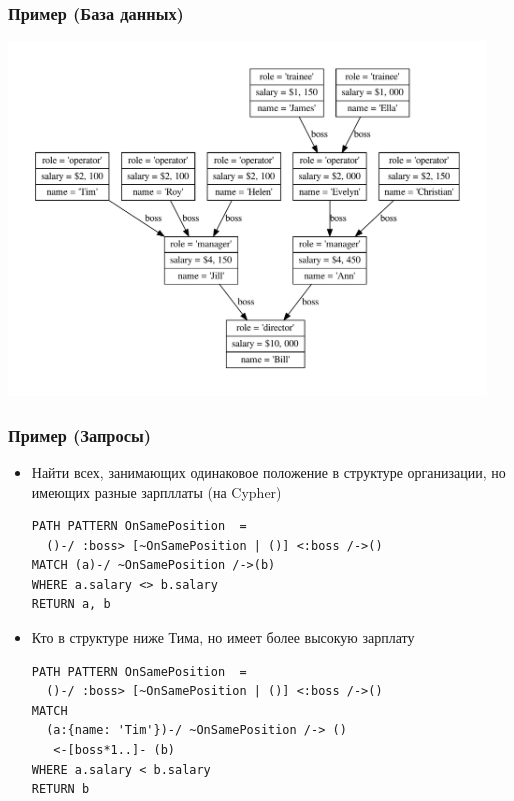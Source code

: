 \documentclass{beamer}
\begin{document}
\begin{frame}[fragile]
  \frametitle{Пример (База данных)}
  \includegraphics[width=0.95\textwidth]{figures/cfpq_example.pdf}
\end{frame}


\begin{frame}[fragile]
  \frametitle{Пример (Запросы)}
  \begin{itemize}
  \item Найти всех, занимающих одинаковое положение в структуре организации, но имеющих разные зарпллаты (на Cypher)
    \begin{verbatim}
PATH PATTERN OnSamePosition  =
  ()-/ :boss> [~OnSamePosition | ()] <:boss /->()
MATCH (a)-/ ~OnSamePosition /->(b)
WHERE a.salary <> b.salary
RETURN a, b
    \end{verbatim}
\pause
  \item Кто в структуре ниже Тима, но имеет более высокую зарплату
    \begin{verbatim}
PATH PATTERN OnSamePosition  =
  ()-/ :boss> [~OnSamePosition | ()] <:boss /->()
MATCH
  (a:{name: 'Tim'})-/ ~OnSamePosition /-> ()
   <-[boss*1..]- (b)
WHERE a.salary < b.salary
RETURN b
    \end{verbatim}

\end{itemize}

\end{frame}
\end{document}
